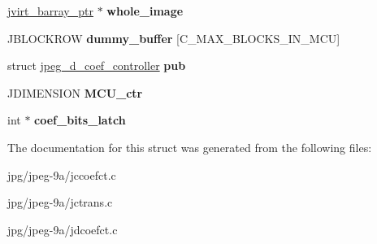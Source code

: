 \begin{DoxyCompactItemize}
\item 
\hypertarget{structmy__coef__controller_a7e6db8186140ced6ed561b2860c84819}{\hyperlink{structjvirt__barray__control}{jvirt\+\_\+barray\+\_\+ptr} $\ast$ {\bfseries whole\+\_\+image}}\label{structmy__coef__controller_a7e6db8186140ced6ed561b2860c84819}

\item 
\hypertarget{structmy__coef__controller_a5cffa07081b1c4361d9dfe48373c8240}{J\+B\+L\+O\+C\+K\+R\+O\+W {\bfseries dummy\+\_\+buffer} \mbox{[}C\+\_\+\+M\+A\+X\+\_\+\+B\+L\+O\+C\+K\+S\+\_\+\+I\+N\+\_\+\+M\+C\+U\mbox{]}}\label{structmy__coef__controller_a5cffa07081b1c4361d9dfe48373c8240}

\item 
\hypertarget{structmy__coef__controller_a09524018020a2d7edbbcd92400f0919a}{struct \hyperlink{structjpeg__d__coef__controller}{jpeg\+\_\+d\+\_\+coef\+\_\+controller} {\bfseries pub}}\label{structmy__coef__controller_a09524018020a2d7edbbcd92400f0919a}

\item 
\hypertarget{structmy__coef__controller_a17ccbcfc9a173194725050412855d7cf}{J\+D\+I\+M\+E\+N\+S\+I\+O\+N {\bfseries M\+C\+U\+\_\+ctr}}\label{structmy__coef__controller_a17ccbcfc9a173194725050412855d7cf}

\item 
\hypertarget{structmy__coef__controller_a04a1fed969821365fc54733467a120b9}{int $\ast$ {\bfseries coef\+\_\+bits\+\_\+latch}}\label{structmy__coef__controller_a04a1fed969821365fc54733467a120b9}

\end{DoxyCompactItemize}


The documentation for this struct was generated from the following files\+:\begin{DoxyCompactItemize}
\item 
jpg/jpeg-\/9a/jccoefct.\+c\item 
jpg/jpeg-\/9a/jctrans.\+c\item 
jpg/jpeg-\/9a/jdcoefct.\+c\end{DoxyCompactItemize}
